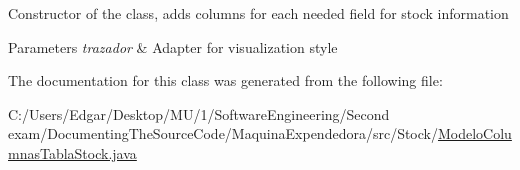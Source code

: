 Constructor of the class, adds columns for each needed field for stock information 
\begin{DoxyParams}{Parameters}
{\em trazador} & Adapter for visualization style \\
\hline
\end{DoxyParams}


The documentation for this class was generated from the following file\+:\begin{DoxyCompactItemize}
\item 
C\+:/\+Users/\+Edgar/\+Desktop/\+M\+U/1/\+Software\+Engineering/\+Second exam/\+Documenting\+The\+Source\+Code/\+Maquina\+Expendedora/src/\+Stock/\mbox{\hyperlink{_modelo_columnas_tabla_stock_8java}{Modelo\+Columnas\+Tabla\+Stock.\+java}}\end{DoxyCompactItemize}
